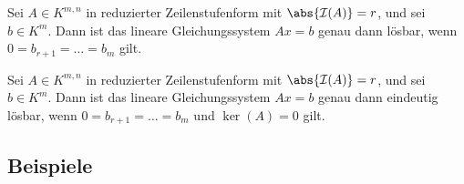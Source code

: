 \documentclass[a4paper]{article}
\begin{document}
\begin{corollary}[Lösbarkeit]
    Sei $A \in K^{m,n}$ in reduzierter Zeilenstufenform mit $\abs{\mathcal{I}(A)} = r$, und sei $b \in K^m$. Dann ist das lineare Gleichungssystem $Ax = b$ genau dann lösbar, wenn $0 = b_{r+1} = \dots = b_m$ gilt.
\end{corollary}

\begin{corollary}
    Sei $A \in K^{m,n}$ in reduzierter Zeilenstufenform mit $\abs{\mathcal{I}(A)} = r$, und sei $b \in K^m$. Dann ist das lineare Gleichungssystem $Ax = b$ genau dann eindeutig lösbar, wenn $0 = b_{r+1} = \dots = b_m$ und $\ker(A) = 0$ gilt.
\end{corollary}

\subsection{Beispiele}
\end{document}
